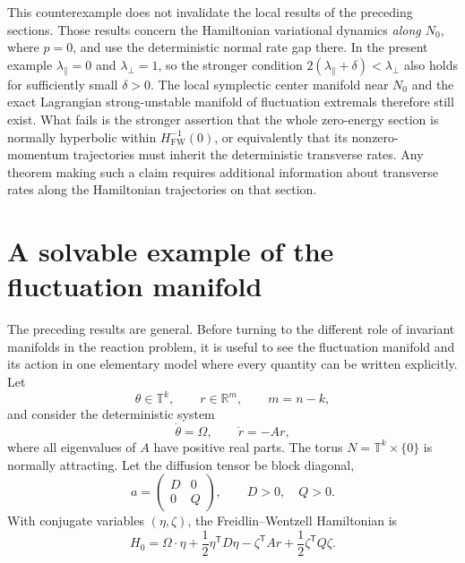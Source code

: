 \documentclass[11pt]{article}
\theoremstyle{definition}
\theoremstyle{remark}
\newcommand{\R}{\mathbb{R}}
\newcommand{\T}{\mathbb{T}}
\newcommand{\Hs}{H_{\mathrm{FW}}}
\newcommand{\cT}{\mathsf{T}}
\begin{document}
This counterexample does not invalidate the local results of the preceding sections.  Those results concern the Hamiltonian variational dynamics \emph{along $N_0$}, where $p=0$, and use the deterministic normal rate gap there.  In the present example $\lambda_\parallel=0$ and $\lambda_\perp=1$, so the stronger condition $2(\lambda_\parallel+\delta)<\lambda_\perp$ also holds for sufficiently small $\delta>0$.  The local symplectic center manifold near $N_0$ and the exact Lagrangian strong-unstable manifold of fluctuation extremals therefore still exist.  What fails is the stronger assertion that the whole zero-energy section is normally hyperbolic within $\Hs^{-1}(0)$, or equivalently that its nonzero-momentum trajectories must inherit the deterministic transverse rates.  Any theorem making such a claim requires additional information about transverse rates along the Hamiltonian trajectories on that section.

\section{A solvable example of the fluctuation manifold}
\label{sec:exact-torus}

The preceding results are general.  Before turning to the different role of invariant manifolds in the reaction problem, it is useful to see the fluctuation manifold and its action in one elementary model where every quantity can be written explicitly.  Let
\[
\theta\in\T^k,\qquad r\in\R^m,\qquad m=n-k,
\]
and consider the deterministic system
\begin{equation}
\dot\theta=\Omega,
\qquad
\dot r=-Ar,
\label{eq:linear-torus-drift}
\end{equation}
where all eigenvalues of $A$ have positive real parts.  The torus $N=\T^k\times\{0\}$ is normally attracting.  Let the diffusion tensor be block diagonal,
\begin{equation}
a=
\begin{pmatrix}
D&0\\0&Q
\end{pmatrix},
\qquad D>0,\quad Q>0.
\end{equation}
With conjugate variables $(\eta,\zeta)$, the Freidlin--Wentzell Hamiltonian is
\begin{equation}
H_0
=
\Omega\cdot\eta+\frac12\eta^{\cT}D\eta
-\zeta^{\cT}Ar+\frac12\zeta^{\cT}Q\zeta.
\label{eq:linear-torus-H}
\end{equation}
\end{document}

